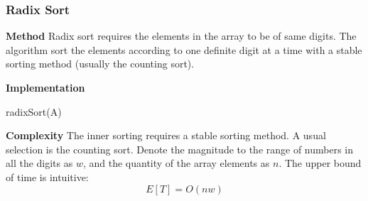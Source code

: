 \documentclass[11pt]{article}
\begin{document}
\subsubsection{Radix Sort}
\noindent \textbf{Method}
Radix sort requires the elements in the array to be of same digits. The algorithm sort the elements according to one definite digit at a time with a stable sorting method (usually the counting sort). \par \noindent
\textbf{Implementation}
\begin{algorithm}
    \caption{radixSort(A)}
    \label{radSort}
    \begin{algorithmic}
        \ENDFOR
    \end{algorithmic}
\end{algorithm} \par \noindent
\textbf{Complexity}
The inner sorting requires a stable sorting method. A usual selection is the counting sort. Denote the magnitude to the range of numbers in all the digits as $w$, and the quantity of the array elements as $n$. The upper bound of time is intuitive:
\begin{equation}
    E[T] = O(nw)
\end{equation}
\end{document}

